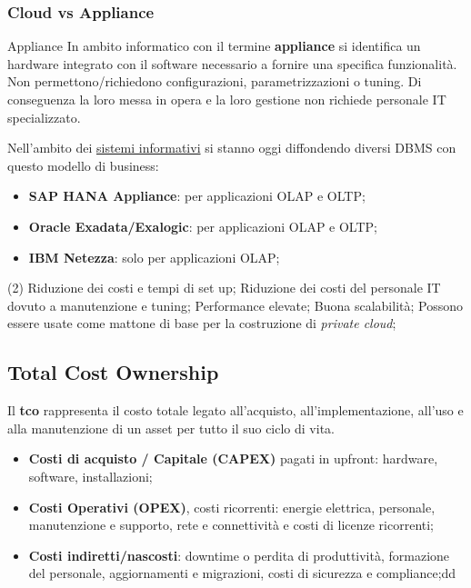 \subsubsection{Cloud vs Appliance}\label{sub:ftt_cloud_vs_appliance} %
\begin{definition}{Appliance}{}
    In ambito informatico con il termine \textbf{appliance} si identifica un hardware integrato con il software necessario a fornire una specifica funzionalità.
    Non permettono/richiedono configurazioni, parametrizzazioni o tuning.
    Di conseguenza la loro messa in opera e la loro gestione non richiede personale IT specializzato.
\end{definition}
Nell'ambito dei \hyperref[sub:il_sistema_informativo]{sistemi informativi} si stanno oggi diffondendo diversi DBMS con questo modello di business:
\begin{itemize}
    \item \textbf{SAP HANA Appliance}: per applicazioni OLAP e OLTP;
    \item \textbf{Oracle Exadata/Exalogic}: per applicazioni OLAP e OLTP;
    \item \textbf{IBM Netezza}: solo per applicazioni OLAP;
\end{itemize}
\begin{note}[Vantaggi]
    \begin{tasks}(2)
        \task Riduzione dei costi e tempi di set up;
        \task Riduzione dei costi del personale IT dovuto a manutenzione e tuning;
        \task Performance elevate;
        \task Buona scalabilità;
        \task Possono essere usate come mattone di base per la costruzione di \textit{private cloud};
    \end{tasks}
\end{note}
%
\subsection{Total Cost Ownership}\label{sub:ftt_total_cost_ownership} %
Il \textbf{\ac{tco}} rappresenta il costo totale legato all'acquisto, all'implementazione, all'uso e alla manutenzione di un asset per tutto il suo ciclo di vita.
\begin{itemize}
    \item \textbf{Costi di acquisto / Capitale (CAPEX)} pagati in upfront: hardware, software, installazioni;
    \item \textbf{Costi Operativi (OPEX)}, costi ricorrenti: energie elettrica, personale, manutenzione e supporto, rete e connettività e costi di licenze ricorrenti;
    \item \textbf{Costi indiretti/nascosti}: downtime o perdita di produttività, formazione del personale, aggiornamenti e migrazioni, costi di sicurezza e compliance;dd
\end{itemize}
%
